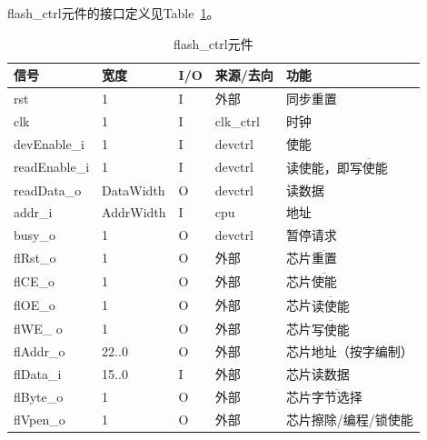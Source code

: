 \documentclass{article}
\begin{document}
\begin{spacing}{1.4}
flash\_ctrl元件的接口定义见Table~\ref{tb:flashctrl-interface}。
\begin{table}[!htb]
\begin{center}
\begin{tabular*}{15cm}{l|l|l|l|p{5cm}}
\hline
\textbf{信号}&\textbf{宽度}&\textbf{I/O}&\textbf{来源/去向}&\textbf{功能} \\
\hline rst                     & 1                      & I     & 外部          & 同步重置 \\
\hline clk                     & 1                      & I     & clk\_ctrl     & 时钟 \\
\hline devEnable\_i            & 1                      & I     & devctrl       & 使能 \\
\hline readEnable\_i           & 1                      & I     & devctrl       & 读使能，即$\overline{\text{写使能}}$ \\
\hline readData\_o             & DataWidth              & O     & devctrl       & 读数据 \\
\hline addr\_i                 & AddrWidth              & I     & cpu           & 地址 \\
\hline busy\_o                 & 1                      & O     & devctrl       & 暂停请求 \\
\hline flRst\_o                & 1                      & O     & 外部          & 芯片$\overline{\text{重置}}$ \\
\hline flCE\_o                 & 1                      & O     & 外部          & 芯片$\overline{\text{使能}}$ \\
\hline flOE\_o                 & 1                      & O     & 外部          & 芯片$\overline{\text{读使能}}$ \\
\hline flWE\_ o                & 1                      & O     & 外部          & 芯片$\overline{\text{写使能}}$ \\
\hline flAddr\_o               & 22..0                  & O     & 外部          & 芯片地址（按字编制） \\
\hline flData\_i               & 15..0                  & I     & 外部          & 芯片读数据 \\
\hline flByte\_o               & 1                      & O     & 外部          & 芯片$\overline{\text{字节选择}}$ \\
\hline flVpen\_o               & 1                      & O     & 外部          & 芯片擦除/编程/锁使能 \\
\hline
\end{tabular*}
\caption{flash\_ctrl元件}
\label{tb:flashctrl-interface}
\end{center}
\end{table}


\end{spacing}
\end{document}
